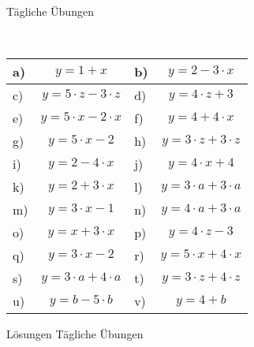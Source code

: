 \documentclass[12pt]{article}
\begin{document}
\centerline{{\Large Tägliche Übungen}} 
\vspace{1cm}
\noindent \\


\begin{xltabular}{\textwidth}{|C{0.75cm}|X|C{0.75cm}|X|}
\hline
a)&$$y=1 + x$$
&
b)&$$y=2 - 3 \cdot x$$
\\\hline
c)&$$y=5 \cdot z - 3 \cdot z$$
&
d)&$$y=4 \cdot z + 3$$
\\\hline
e)&$$y=5 \cdot x - 2 \cdot x$$
&
f)&$$y=4 + 4 \cdot x$$
\\\hline
g)&$$y=5 \cdot x - 2$$
&
h)&$$y=3 \cdot z + 3 \cdot z$$
\\\hline
i)&$$y=2 - 4 \cdot x$$
&
j)&$$y=4 \cdot x + 4$$
\\\hline
k)&$$y=2 + 3 \cdot x$$
&
l)&$$y=3 \cdot a + 3 \cdot a$$
\\\hline
m)&$$y=3 \cdot x - 1$$
&
n)&$$y=4 \cdot a + 3 \cdot a$$
\\\hline
o)&$$y=x + 3 \cdot x$$
&
p)&$$y=4 \cdot z - 3$$
\\\hline
q)&$$y=3 \cdot x - 2$$
&
r)&$$y=5 \cdot x + 4 \cdot x$$
\\\hline
s)&$$y=3 \cdot a + 4 \cdot a$$
&
t)&$$y=3 \cdot z + 4 \cdot z$$
\\\hline
u)&$$y=b - 5 \cdot b$$
&
v)&$$y=4 + b$$
\\\hline
\end{xltabular}
\vspace{0.5cm}
\newpage
{}
\centerline{{\large Lösungen Tägliche Übungen}} 
\vspace{0.5cm}
\end{document}
